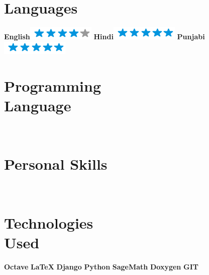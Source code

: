 \documentclass[]{friggeri-cv}
\begin{document}
\begin{aside}
  \section{Languages}
     \textbf{English}\includegraphics[scale=0.40]{img/4stars.png}
      \textbf{Hindi}\includegraphics[scale=0.40]{img/5stars.png}
      \textbf{Punjabi}\includegraphics[scale=0.40]{img/5stars.png}

  \section{Programming \\ Language}
    ~
  \section{Personal Skills}
    ~
  \section{Technologies \\ Used}
        \textbf{Octave}
        \textbf{LaTeX}
        \textbf{Django}
        \textbf{Python}
        \textbf{SageMath}
        \textbf{Doxygen}
        \textbf{GIT}
     ~      
\end{aside}
\end{document}
